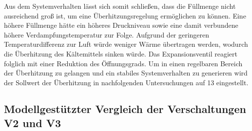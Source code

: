 Aus dem Systemverhalten lässt sich somit schließen, dass die Füllmenge nicht ausreichend groß ist, um eine Überhitzungsregelung ermöglichen zu können. Eine höhere Füllmenge hätte ein höheres Druckniveau sowie eine damit verbundene höhere Verdampfungstemperatur zur Folge. Aufgrund der geringeren Temperaturdifferenz zur Luft würde weniger Wärme übertragen werden, wodurch die Überhitzung des Kältemittels sinken würde. Das Expansionsventil reagiert folglich mit einer Reduktion des Öffnungsgrads. Um in einen regelbaren Bereich der Überhitzung zu gelangen und ein stabiles Systemverhalten zu generieren wird der Sollwert der Überhitzung in nachfolgenden Untersuchungen auf \unit{13}{\kelvin} eingestellt. 



\subsection{Modellgestützter Vergleich der Verschaltungen V2 und V3}
\label{subsec:Modellgestützter Vergleich der Verschaltungen V2 und V3_1}

